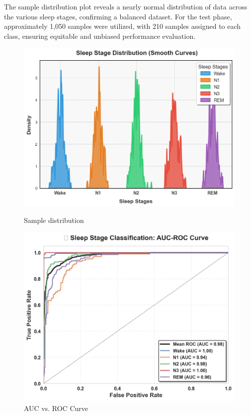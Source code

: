 The sample distribution plot reveals a nearly normal distribution of data across the various sleep stages, confirming a balanced dataset. For the test phase, approximately 1,050 samples were utilized, with 210 samples assigned to each class, ensuring equitable and unbiased performance evaluation.

\begin{figure}[htbp]
	\centering
	\begin{minipage}[b]{0.45\linewidth}
		\includegraphics[width=\linewidth]{img/paper_3/sample distribution plot pdf}
		\caption{Sample distribution}
		\label{fig:sample-distribution-plot-pdf}
	\end{minipage}
	\hfill
	\begin{minipage}[b]{0.45\linewidth}
		\includegraphics[width=\linewidth]{img/paper_3/auc vs roc curve}
		\caption{AUC vs. ROC Curve}
		\label{fig:auc-vs-roc-curve}
	\end{minipage}
\end{figure}

